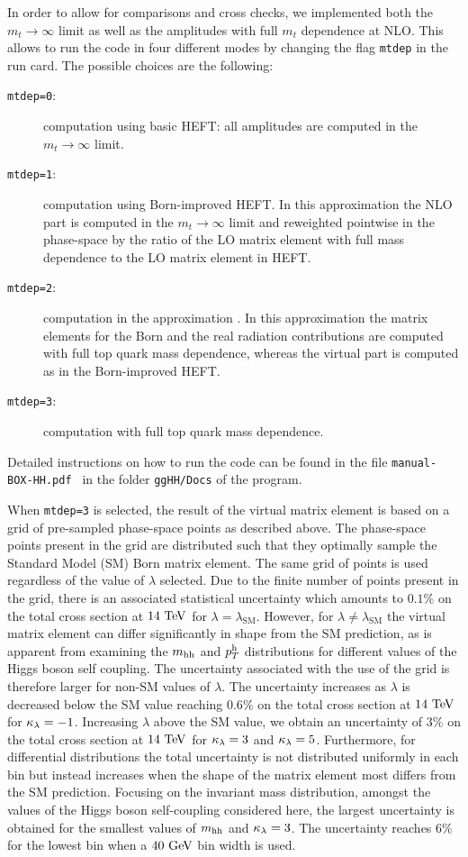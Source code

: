 In order to allow for comparisons and cross checks, we implemented
both the $m_t\to\infty$ limit as well as the  amplitudes with full $m_t$ dependence at
NLO. This allows to run the code in four different modes by changing
the flag {\tt mtdep} in the \powhegbox{} run card. The possible
choices are the following:
\begin{description}
 \item[{\tt mtdep=0}:]{computation using basic HEFT: all amplitudes
   are computed in the $m_t\to\infty$ limit.}
\item[{\tt mtdep=1}:]{computation using Born-improved HEFT. In this
   approximation the NLO part is computed in the $m_t\to\infty$ limit
   and reweighted pointwise in the phase-space by the ratio of the LO matrix
   element with full mass dependence to  the LO matrix
   element in HEFT.}
 \item[{\tt mtdep=2}:]{computation in the approximation \ftapprox. In
   this approximation the matrix elements for the Born and the real
   radiation contributions are computed with full top quark mass dependence, whereas the virtual part is
   computed as in the Born-improved HEFT. }
 \item[{\tt mtdep=3}:]{computation with full top quark mass dependence.}
\end{description}
Detailed instructions on how to run the code can be found in the
file {\tt manual-BOX-HH.pdf } in the folder {\tt ggHH/Docs} of the program.

When {\tt mtdep=3} is selected, the result of the virtual matrix element is based on a grid of pre-sampled phase-space points as described above. The phase-space points present in the grid are distributed such that they optimally sample the Standard Model (SM) Born matrix element. The same grid of points is used regardless of the value of $\lambda$ selected. Due to the finite number of points present in the grid, there is an associated statistical uncertainty which amounts to $0.1\%$ on the total cross section at $14\ \TeV$ for $\lambda=\lambda_\mathrm{SM}$. However, for $\lambda \neq \lambda_\mathrm{SM}$ the virtual matrix element can differ significantly in shape from the SM prediction, as is apparent from examining the $m_{\mathrm{hh}}$ and $p_T^{\mathrm{h}}$ distributions for different values of the Higgs boson self coupling. The uncertainty associated with the use of the grid is therefore larger for non-SM values of $\lambda$. The uncertainty increases as $\lambda$ is decreased below the SM value reaching $0.6\%$ on the total cross section at $14\ \TeV$ for $\kappa_{\lambda} = -1$. Increasing $\lambda$ above the SM value, we obtain an uncertainty of $3\%$ on the total cross section at $14\ \TeV$ for $\kappa_{\lambda} = 3$ and  $\kappa_{\lambda} = 5$. Furthermore, for differential distributions the total uncertainty is not distributed uniformly in each bin but instead increases when the shape of the matrix element most differs from the SM prediction. Focusing on the invariant mass distribution, amongst the values of the Higgs boson self-coupling considered here, the largest uncertainty is obtained for the smallest values of $m_{\mathrm{hh}}$ and $\kappa_{\lambda}=3$. The uncertainty reaches $6\%$ for the lowest bin when a $40\ \mathrm{GeV}$ bin width is used.

